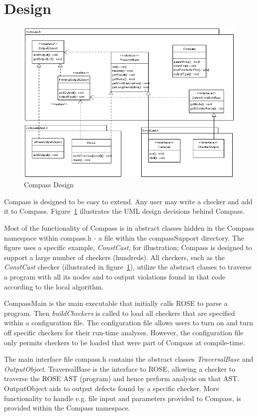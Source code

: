 \section{Design}

\begin{figure}[thb]
\includegraphics[width=6.0in]{compassdesign.png}
\caption{Compass Design}
\label{CompassDesign}
\end{figure}

Compass is designed to be easy to extend. Any user may write a checker and add it to
Compass. Figure~\ref{CompassDesign} illustrates the UML design decisions behind Compass.


Most of the functionality of Compass is in abstract classes hidden in the Compass
namespace within compass.h - a file within the compassSupport directory. The figure uses a
specific example, {\em ConstCast}, for illustration; Compass is designed to support a large
number of checkers (hundreds). All checkers, such as the {\em ConstCast} checker (illustrated in
figure~\ref{CompassDesign}), utilize the abstract classes to traverse a program with all
its nodes and to output violations found in that code according to the local algorithm.

CompassMain is the main executable that initially calls ROSE to parse a program. Then
\emph{buildCheckers} is called to load all checkers that are specified within a
configuration file. The configuration file allows users to turn on and turn off specific
checkers for their run-time analyses. However, the configuration file only permits
checkers to be loaded that were part of Compass at compile-time.

The main interface file compass.h contains the abstract classes \emph{TraversalBase} and 
\emph{OutputObject}. TraversalBase is the interface to ROSE, allowing a checker to
traverse the ROSE AST (program) and hence perform analysis on that AST. OutputObject aids
to output defects found by a specific checker. More functionality to handle e.g. file
input and parameters provided to Compass, is provided within the Compass namespace.

